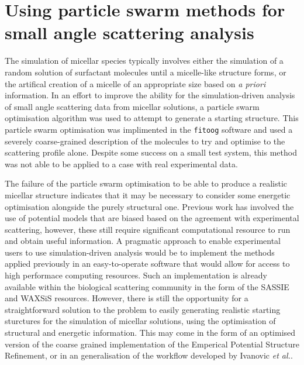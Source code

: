 \section{Using particle swarm methods for small angle scattering analysis}
The simulation of micellar species typically involves either the simulation of a random solution of surfactant molecules until a micelle-like structure forms, or the artifical creation of a micelle of an appropriate size based on \emph{a priori} information.
In an effort to improve the ability for the simulation-driven analysis of small angle scattering data from micellar solutions, a particle swarm optimisation algorithm was used to attempt to generate a starting structure.
This particle swarm optimisation was implimented in the \texttt{fitoog} software and used a severely coarse-grained description of the molecules to try and optimise to the scattering profile alone.
Despite some success on a small test system, this method was not able to be applied to a case with real experimental data.

The failure of the particle swarm optimisation to be able to produce a realistic micellar structure indicates that it may be necessary to consider some energetic optimisation alongside the purely structural one.
Previous work has involved the use of potential models that are biased based on the agreement with experimental scattering,\autocite{hargreaves_atomistic_2011,soper_coarse-grained_2017,ivanovic_temperature-dependent_2018} however, these still require significant computational resource to run and obtain useful information.
A pragmatic approach to enable experimental users to use simulation-driven analysis would be to implement the methods applied previously in an easy-to-operate software that would allow for access to high performace computing resources.
Such an implementation is already available within the biological scattering community in the form of the SASSIE\autocite{perkins_atomistic_2016} and WAXSiS\autocite{knight_waxsis_2015} resources.
However, there is still the opportunity for a straightforward solution to the problem to easily generating realistic starting sturctures for the simulation of micellar solutions, using the optimisation of structural and energetic information.
This may come in the form of an optimised version of the coarse grained implementation of the Emperical Potential Structure Refinement,\autocite{soper_coarse-grained_2017} or in an generalisation of the workflow developed by Ivanovic \emph{et al.}.\autocite{ivanovic_temperature-dependent_2018}

